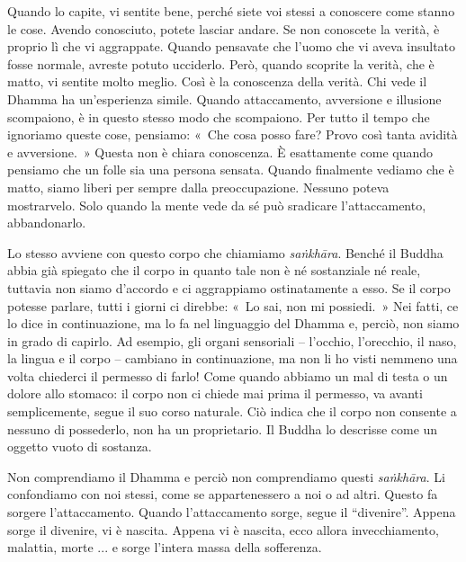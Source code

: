Quando lo capite, vi sentite bene, perché siete voi stessi a conoscere
come stanno le cose. Avendo conosciuto, potete lasciar andare. Se non
conoscete la verità, è proprio lì che vi aggrappate. Quando pensavate
che l'uomo che vi aveva insultato fosse normale, avreste potuto
ucciderlo. Però, quando scoprite la verità, che è matto, vi sentite
molto meglio. Così è la conoscenza della verità. Chi vede il Dhamma ha
un'esperienza simile. Quando attaccamento, avversione e illusione
scompaiono, è in questo stesso modo che scompaiono. Per tutto il tempo
che ignoriamo queste cose, pensiamo: «~Che cosa posso fare? Provo così
tanta avidità e avversione.~» Questa non è chiara conoscenza. È
esattamente come quando pensiamo che un folle sia una persona sensata.
Quando finalmente vediamo che è matto, siamo liberi per sempre dalla
preoccupazione. Nessuno poteva mostrarvelo. Solo quando la mente vede da
sé può sradicare l'attaccamento, abbandonarlo.

Lo stesso avviene con questo corpo che chiamiamo \emph{saṅkhāra}. Benché
il Buddha abbia già spiegato che il corpo in quanto tale non è né
sostanziale né reale, tuttavia non siamo d'accordo e ci aggrappiamo
ostinatamente a esso. Se il corpo potesse parlare, tutti i giorni ci
direbbe: «~Lo sai, non mi possiedi.~» Nei fatti, ce lo dice in
continuazione, ma lo fa nel linguaggio del Dhamma e, perciò, non siamo
in grado di capirlo. Ad esempio, gli organi sensoriali -- l'occhio,
l'orecchio, il naso, la lingua e il corpo -- cambiano in continuazione,
ma non li ho visti nemmeno una volta chiederci il permesso di farlo!
Come quando abbiamo un mal di testa o un dolore allo stomaco: il corpo
non ci chiede mai prima il permesso, va avanti semplicemente, segue il
suo corso naturale. Ciò indica che il corpo non consente a nessuno di
possederlo, non ha un proprietario. Il Buddha lo descrisse come un
oggetto vuoto di sostanza.

Non comprendiamo il Dhamma e perciò non comprendiamo questi
\emph{saṅkhāra}. Li confondiamo con noi stessi, come se appartenessero a
noi o ad altri. Questo fa sorgere l'attaccamento. Quando l'attaccamento
sorge, segue il ``divenire''. Appena sorge il divenire, vi è nascita.
Appena vi è nascita, ecco allora invecchiamento, malattia, morte ... e
sorge l'intera massa della sofferenza.


